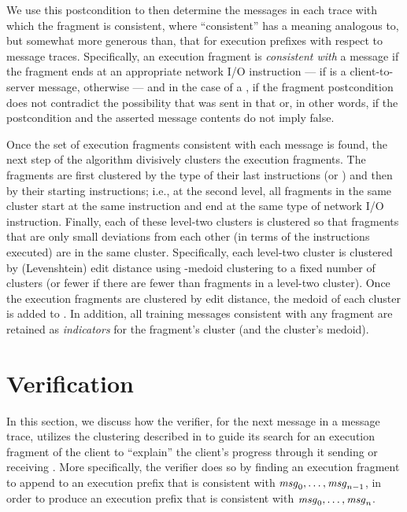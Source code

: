 We use this
postcondition to then determine the messages in 
each
trace with which
the fragment is consistent, where ``consistent'' has a meaning
analogous to, but somewhat more generous than, that for execution
prefixes with respect to message traces.  Specifically, an execution
fragment is \textit{consistent with} a message \msg{}
if the fragment ends at an appropriate network I/O instruction --- \sendInstr
if \msg{} is a client-to-server message, \recvInstr otherwise ---
and in the case of a \sendInstr{},  if the fragment postcondition
does not contradict the possibility that \msg{} was sent in that
\sendInstr{} or, in other words, if
the postcondition and the asserted message contents do not imply false.  

Once the set of execution fragments consistent with each message is
found, the next step of the algorithm divisively clusters the
execution fragments.  The fragments are first clustered by the type of
their last instructions (\sendInstr or \recvInstr) and then by their
starting instructions; i.e., at the second level, all fragments in the
same cluster start at the same instruction and end at the same type of
network I/O instruction.  Finally, each of these level-two clusters is
clustered so that fragments that are only small deviations from each
other (in terms of the instructions executed) are in the same cluster.
Specifically, each level-two cluster is clustered by (Levenshtein) edit distance
using \clusters-medoid clustering to a fixed number of clusters
\clusters (or fewer if there are fewer than \clusters fragments in a
level-two cluster).  Once the execution fragments are clustered by
edit distance, the medoid of each cluster is added to
\trainingFrags{}.  In addition, all training messages
consistent with any fragment are retained as
\textit{indicators} for the fragment's cluster (and the cluster's medoid).

\section{Verification} 
\label{sec:guided:verification}

In this section, we discuss how the verifier, for the next message
\msg{\msgNmbr} in a message trace, utilizes the clustering described
in  to guide its search for an execution fragment
of the client to ``explain'' the client's progress through it sending
or receiving \msg{\msgNmbr}.  More specifically, the verifier does so
by finding an execution fragment to append to an execution prefix
 that is consistent with $\mathit{msg}_{0}, \ldots,
\mathit{msg}_{n-1}$, in order to produce an execution prefix
\execPrefix{\msgNmbr} that is consistent with $\mathit{msg}_{0}, \ldots,
\mathit{msg}_{n}$.

